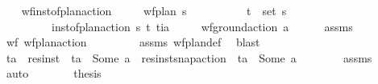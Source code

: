 \begin{isabellebody}
\begin{isamarkuptext}
\end{isamarkuptext}\isamarkuptrue%
\ \ \isamarkupfalse%
\ wf{\isacharunderscore}{\kern0pt}inst{\isacharunderscore}{\kern0pt}of{\isacharunderscore}{\kern0pt}plan{\isacharunderscore}{\kern0pt}action{\isacharcolon}{\kern0pt}\isanewline
\ \ \ \ \ {\isachardoublequoteopen}wf{\isacharunderscore}{\kern0pt}plan\ {\isasympi}s{\isachardoublequoteclose}\ \isanewline
\ \ \ \ \ \ \ \ \ {\isachardoublequoteopen}{\isacharparenleft}{\kern0pt}t\isactrlsub {\isasympi}{\isacharcomma}{\kern0pt}{\isasympi}{\isacharparenright}{\kern0pt}\ {\isasymin}\ set\ {\isasympi}s{\isachardoublequoteclose}\ \isanewline
\ \ \ \ \ \ \ \ \ {\isachardoublequoteopen}inst{\isacharunderscore}{\kern0pt}of{\isacharunderscore}{\kern0pt}plan{\isacharunderscore}{\kern0pt}action\ {\isasympi}s\ {\isacharparenleft}{\kern0pt}t\isactrlsub {\isasympi}{\isacharcomma}{\kern0pt}{\isasympi}{\isacharparenright}{\kern0pt}\ {\isacharparenleft}{\kern0pt}t\isactrlsub i{\isacharcomma}{\kern0pt}a{\isacharparenright}{\kern0pt}{\isachardoublequoteclose}\isanewline
\ \ \ \ \ {\isachardoublequoteopen}wf{\isacharunderscore}{\kern0pt}ground{\isacharunderscore}{\kern0pt}action\ a{\isachardoublequoteclose}\isanewline
%
\isadelimproof
\ \ \ \ %
\endisadelimproof
%
\isatagproof
{}\isamarkupfalse%
\ assms\isanewline
\ \ \isamarkupfalse%
\ {\isacharminus}{\kern0pt}\isanewline
\ \ \ \ \isamarkupfalse%
\ wf{\isacharunderscore}{\kern0pt}{\isasympi}{\isacharcolon}{\kern0pt}\ {\isachardoublequoteopen}wf{\isacharunderscore}{\kern0pt}plan{\isacharunderscore}{\kern0pt}action\ {\isasympi}{\isachardoublequoteclose}\isanewline
\ \ \ \ \ \ \isamarkupfalse%
\ assms\ wf{\isacharunderscore}{\kern0pt}plan{\isacharunderscore}{\kern0pt}def\ \isamarkupfalse%
\ blast\isanewline
\ \ \ \ \isamarkupfalse%
\ ta\ \ {\isachardoublequoteopen}res{\isacharunderscore}{\kern0pt}inst\ {\isasympi}\ ta\ {\isacharequal}{\kern0pt}\ Some\ a\ {\isasymor}\ res{\isacharunderscore}{\kern0pt}inst{\isacharunderscore}{\kern0pt}snap{\isacharunderscore}{\kern0pt}action\ {\isasympi}\ ta\ {\isacharequal}{\kern0pt}\ Some\ a{\isachardoublequoteclose}\isanewline
\ \ \ \ \ \ \isamarkupfalse%
\ assms\ \isamarkupfalse%
\ auto\isanewline
\ \ \ \ \isamarkupfalse%
\ \isamarkupfalse%
\ {\isacharquery}{\kern0pt}thesis\isanewline

\end{isabellebody}

